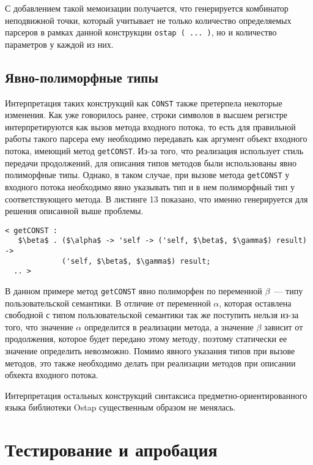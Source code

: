 С добавлением такой мемоизации получается, что генерируется комбинатор неподвижной точки, который учитывает не только количество определяемых парсеров в рамках данной конструкции \lstinline|ostap ( ... )|, но и количество параметров у каждой из них.

\subsection{Явно-полиморфные типы}

Интерпретация таких конструкций как \lstinline|CONST| также претерпела некоторые изменения. Как уже говорилось ранее, строки символов в высшем регистре интерпретируются как вызов метода входного потока, то есть для правильной работы такого парсера ему необходимо передавать как аргумент объект входного потока, имеющий метод \lstinline|getCONST|. Из-за того, что реализация использует стиль передачи продолжений, для описания типов методов были использованы явно полиморфные типы. Однако, в таком случае, при вызове метода \lstinline|getCONST| у входного потока необходимо явно указывать тип и в нем полиморфный тип у соответствующего метода. В листинге 13 показано, что именно генерируется для решения описанной выше проблемы.

\begin{lstlisting}[basicstyle=\small, caption=Генерируемый код для конструкции CONST]
< getCONST :
   $\beta$ . ($\alpha$ -> 'self -> ('self, $\beta$, $\gamma$) result) ->
             ('self, $\beta$, $\gamma$) result;
  .. >
\end{lstlisting}

В данном примере метод \lstinline|getCONST| явно полиморфен по переменной $\beta$~--- типу пользовательской семантики. В отличие от переменной $\alpha$, которая оставлена свободной с типом пользовательской семантики так же поступить нельзя из-за того, что значение $\alpha$ определится в реализации метода, а значение $\beta$ зависит от продолжения, которое будет передано этому методу, поэтому статически ее значение определить невозможно. Помимо явного указания типов при вызове методов, это также необходимо делать при реализации методов при описании обхекта входного потока.

Интерпретация остальных конструкций синтаксиса предметно-ориентированного языка библиотеки Ostap существенным образом не менялась.

\section{Тестирование и апробация}

